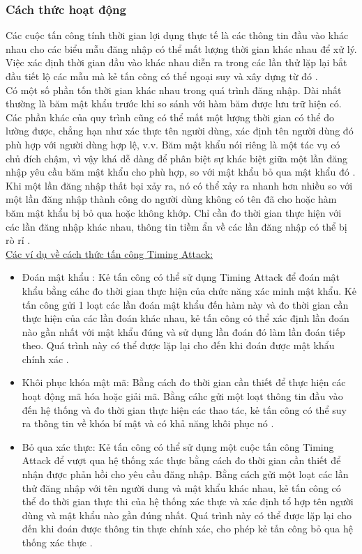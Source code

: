 \subsubsection{Cách thức hoạt động}
Các cuộc tấn công tính thời gian lợi dụng thực tế là các thông tin đầu vào khác nhau cho các biểu mẫu đăng nhập có thể mất lượng thời gian khác nhau để xử lý. Việc xác định thời gian đầu vào khác nhau diễn ra trong các lần thử lặp lại bắt đầu tiết lộ các mẫu mà kẻ tấn công có thể ngoại suy và xây dựng từ đó \cite{wright-2023}.\\
\indent Có một số phần tốn thời gian khác nhau trong quá trình đăng nhập. Dài nhất thường là băm mật khẩu trước khi so sánh với hàm băm được lưu trữ hiện có. Các phần khác của quy trình cũng có thể mất một lượng thời gian có thể đo lường được, chẳng hạn như xác thực tên người dùng, xác định tên người dùng đó phù hợp với người dùng hợp lệ, v.v. Băm mật khẩu nói riêng là một tác vụ có chủ đích chậm, vì vậy khá dễ dàng để phân biệt sự khác biệt giữa một lần đăng nhập yêu cầu băm mật khẩu cho phù hợp, so với mật khẩu bỏ qua mật khẩu đó \cite{wright-2023}.\\
\indent Khi một lần đăng nhập thất bại xảy ra, nó có thể xảy ra nhanh hơn nhiều so với một lần đăng nhập thành công do người dùng không có tên đã cho hoặc hàm băm mật khẩu bị bỏ qua hoặc không khớp. Chỉ cần đo thời gian thực hiện với các lần đăng nhập khác nhau, thông tin tiềm ẩn về các lần đăng nhập có thể bị rò rỉ \cite{wright-2023}.\\
\underline{Các ví dụ về cách thức tấn công Timing Attack:}
\begin{itemize}
    \item Đoán mật khẩu : Kẻ tấn công có thể sử dụng Timing Attack để đoán mật khẩu bằng cáhc đo thời gian thực hiện của chức năng xác minh mật khẩu. Kẻ tấn công gửi 1 loạt các lần đoán mật khẩu đến hàm này và đo thời gian cần thực hiện của các lần đoán khác nhau, kẻ tấn công có thể xác định lần đoán nào gần nhất với mật khẩu đúng và sử dụng lần đoán đó làm lần đoán tiếp theo. Quá trình này có thể được lặp lại cho đến khi đoán được mật khẩu chính xác \cite{cqr-2023}.
    \item Khôi phục khóa mật mã: Bằng cách đo thời gian cần thiết để thực hiện các hoạt động mã hóa hoặc giải mã. Bằng cáhc gửi một loạt thông tin đầu vào đến hệ thống và đo thời gian thực hiện các thao tác, kẻ tấn công có thể suy ra thông tin về khóa bí mật và có khả năng khôi phục nó \cite{cqr-2023}.
    \item Bỏ qua xác thực: Kẻ tấn công có thể sử dụng một cuộc tấn công Timing Attack để vượt qua hệ thống xác thực bằng cách đo thời gian cần thiết để nhận được phản hồi cho yêu cầu đăng nhập. Bằng cách gửi một loạt các lần thử đăng nhập với tên người dung và mật khẩu khác nhau, kẻ tấn công có thể đo thời gian thực thi của hệ thống xác thực và xác định tổ hợp tên người dùng và mật khẩu nào gần đúng nhất. Quá trình này có thể được lặp lại cho đến khi đoán được thông tin thực chính xác, cho phép kẻ tấn công bỏ qua hệ thống xác thực \cite{cqr-2023}.

\end{itemize}
